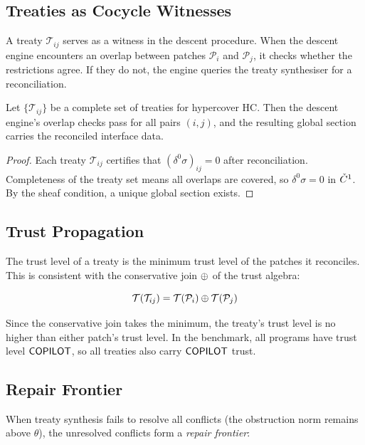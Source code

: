 \documentclass[11pt]{article}
\newcommand{\treaty}{\mathcal{T}}
\newcommand{\patch}{\mathcal{P}}
\newcommand{\cthresh}{\theta}
\newcommand{\HC}{\mathrm{HC}}
\begin{document}
\subsection{Treaties as Cocycle Witnesses}

A treaty $\treaty_{ij}$ serves as a witness in the descent procedure.
When the descent engine encounters an overlap between patches $\patch_i$
and $\patch_j$, it checks whether the restrictions agree.  If they
do not, the engine queries the treaty synthesiser for a reconciliation.

\begin{proposition}\label{prop:treaty-descent}
Let $\{\treaty_{ij}\}$ be a complete set of treaties for hypercover
$\HC$.  Then the descent engine's overlap checks pass for all pairs
$(i, j)$, and the resulting global section carries the reconciled
interface data.
\end{proposition}

\begin{proof}
Each treaty $\treaty_{ij}$ certifies that $(\delta^0 \sigma)_{ij} = 0$
after reconciliation.  Completeness of the treaty set means all
overlaps are covered, so $\delta^0 \sigma = 0$ in $\check{C}^1$.  By
the sheaf condition, a unique global section exists.
\end{proof}

\subsection{Trust Propagation}

The trust level of a treaty is the minimum trust level of the
patches it reconciles.  This is consistent with the conservative
join $\oplus$ of the trust algebra:

\[
  \trust(\treaty_{ij}) = \trust(\patch_i) \tjoin \trust(\patch_j)
\]

Since the conservative join takes the minimum, the treaty's trust
level is no higher than either patch's trust level.  In the
benchmark, all programs have trust level $\mathsf{COPILOT}$, so all
treaties also carry $\mathsf{COPILOT}$ trust.

\subsection{Repair Frontier}

When treaty synthesis fails to resolve all conflicts (the
obstruction norm remains above $\cthresh$), the unresolved
conflicts form a \emph{repair frontier}:
\end{document}
